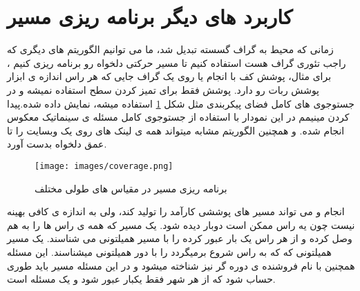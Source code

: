 \section{کاربرد های دیگر برنامه ریزی مسیر}
زمانی که محیط به گراف گسسته تبدیل شد، ما می توانیم الگوریتم های دیگری که راجب تئوری گراف
 هست استفاده کنیم تا مسیر حرکتی دلخواه رو برنامه ریزی کنیم ، برای مثال، پوشش کف با انجام
  یا
 روی یک گراف جایی که هر راس اندازه ی ابزار پوشش ربات رو دارد.  پوشش
فقط برای تمیز کردن سطح استفاده نمیشه و در جستوجوی های کامل فضای پیکربندی مثل شکل
\ref{fig:coverage}
استفاده میشه، نمایش داده شده.پیدا کردن مینیمم در این نمودار با استفاده از جستوجوی کامل مسئله ی سینماتیک معکوس انجام شده.
و  همچنین الگوریتم مشابه میتواند همه ی لینک های روی یک وبسایت را تا عمق دلخواه بدست آورد.
\begin{figure}[H]
\begin{center}
  \texttt{[image: images/coverage.png]}
  \caption{برنامه ریزی مسیر در مقیاس های طولی مختلف}
  \label{fig:coverage}
\end{center}
\end{figure}

انجام 
 و
می تواند  مسیر های پوششی کارآمد را تولید کند، ولی به اندازه ی کافی بهینه نیست
 چون یه راس ممکن است دوبار دیده شود. یک مسیر که همه ی راس ها را به هم وصل کرده و از هر راس یک بار عبور کرده را با مسیر همیلتونی  می شناسند. یک مسیر همیلتونی که که به راس شروع برمیگردد را با دور همیلتونی میشناسند. این مسئله همچنین با نام فروشنده ی دوره گر نیز شناخته میشود و در این مسئله مسیر باید طوری حساب شود که از هر شهر فقط یکبار عبور شود و یک مسئله
 است. 

